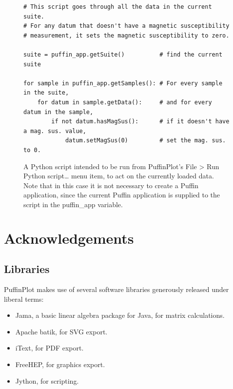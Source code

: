 \documentclass[a4paper,british]{article}
\newcommand{\ppcmd}[1]{\textsf{#1}} %
\newcommand{\caps}[1]{\MakeTextUppercase{#1}} %
\newcommand{\submenu}{ \textgreater{} } %
\begin{document}
\begin{figure}
  \caption{\label{fig:script-example-2} A Python script intended to be run
    from PuffinPlot's \ppcmd{File\submenu Run Python script\ldots} menu item,
    to act on the currently loaded data. Note that in this case it is not
    necessary to create a Puffin application, since the current Puffin
    application is supplied to the script in the \ppcmd{puffin\_app}
    variable. }
  \lstset{language=Python}
\begin{lstlisting}
# This script goes through all the data in the current suite.
# For any datum that doesn't have a magnetic susceptibility
# measurement, it sets the magnetic susceptibility to zero.

suite = puffin_app.getSuite()          # find the current suite

for sample in puffin_app.getSamples(): # For every sample in the suite,
    for datum in sample.getData():     # and for every datum in the sample,
        if not datum.hasMagSus():      # if it doesn't have a mag. sus. value,
            datum.setMagSus(0)         # set the mag. sus. to 0.
\end{lstlisting}
\end{figure}


\section{Acknowledgements}

\subsection*{Libraries}

PuffinPlot makes use of several software libraries generously released under
liberal terms:

\begin{itemize}

\item Jama, a basic linear algebra package for Java, for matrix calculations.

\item Apache batik, for \caps{svg} export.

\item iText, for \caps{pdf} export.

\item FreeHEP, for graphics export.

\item Jython, for scripting.

\end{itemize}
\end{document}
